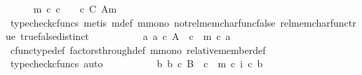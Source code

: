 \begin{isabellebody}
\ \ \ \ \isamarkupfalse%
\ {\isachardoublequoteopen}{\isacharparenleft}{\kern0pt}{\isasymchi}m\ {\isasymcirc}\isactrlsub c\ c\ {\isacharequal}{\kern0pt}\ {\isasymt}{\isacharparenright}{\kern0pt}\ {\isacharequal}{\kern0pt}\ {\isacharparenleft}{\kern0pt}c\ {\isasymin}\isactrlbsub C\isactrlesub \ {\isacharparenleft}{\kern0pt}A{\isacharcomma}{\kern0pt}m{\isacharparenright}{\kern0pt}{\isacharparenright}{\kern0pt}{\isachardoublequoteclose}\isanewline
\ \ \ \ \ \ \isamarkupfalse%
\ {\isacharparenleft}{\kern0pt}typecheck{\isacharunderscore}{\kern0pt}cfuncs{\isacharcomma}{\kern0pt}\ metis\ {\isasymchi}m{\isacharunderscore}{\kern0pt}def\ m{\isacharunderscore}{\kern0pt}mono\ not{\isacharunderscore}{\kern0pt}rel{\isacharunderscore}{\kern0pt}mem{\isacharunderscore}{\kern0pt}char{\isacharunderscore}{\kern0pt}func{\isacharunderscore}{\kern0pt}false\ rel{\isacharunderscore}{\kern0pt}mem{\isacharunderscore}{\kern0pt}char{\isacharunderscore}{\kern0pt}func{\isacharunderscore}{\kern0pt}true\ true{\isacharunderscore}{\kern0pt}false{\isacharunderscore}{\kern0pt}distinct{\isacharparenright}{\kern0pt}\isanewline
\ \ \ \ \isamarkupfalse%
\ \isamarkupfalse%
\ {\isachardoublequoteopen}{\isachardot}{\kern0pt}{\isachardot}{\kern0pt}{\isachardot}{\kern0pt}\ {\isacharequal}{\kern0pt}\ {\isacharparenleft}{\kern0pt}{\isasymexists}\ a{\isachardot}{\kern0pt}\ a\ {\isasymin}\isactrlsub c\ A\ {\isasymand}\ c\ {\isacharequal}{\kern0pt}\ m\ {\isasymcirc}\isactrlsub c\ a{\isacharparenright}{\kern0pt}{\isachardoublequoteclose}\isanewline
\ \ \ \ \ \ \isamarkupfalse%
\ cfunc{\isacharunderscore}{\kern0pt}type{\isacharunderscore}{\kern0pt}def\ factors{\isacharunderscore}{\kern0pt}through{\isacharunderscore}{\kern0pt}def\ m{\isacharunderscore}{\kern0pt}mono\ relative{\isacharunderscore}{\kern0pt}member{\isacharunderscore}{\kern0pt}def{}\ \isamarkupfalse%
\ {\isacharparenleft}{\kern0pt}typecheck{\isacharunderscore}{\kern0pt}cfuncs{\isacharcomma}{\kern0pt}\ auto{\isacharparenright}{\kern0pt}\isanewline
\ \ \ \ \isamarkupfalse%
\ \isamarkupfalse%
\ {\isachardoublequoteopen}{\isachardot}{\kern0pt}{\isachardot}{\kern0pt}{\isachardot}{\kern0pt}\ {\isacharequal}{\kern0pt}\ {\isacharparenleft}{\kern0pt}{\isasymexists}\ b{\isachardot}{\kern0pt}\ b\ {\isasymin}\isactrlsub c\ B\ {\isasymand}\ c\ {\isacharequal}{\kern0pt}\ m\ {\isasymcirc}\isactrlsub c\ i\ {\isasymcirc}\isactrlsub c\ b{\isacharparenright}{\kern0pt}{\isachardoublequoteclose}\isanewline
\ \ \ \ \ \ \isamarkupfalse%

\end{isabellebody}
